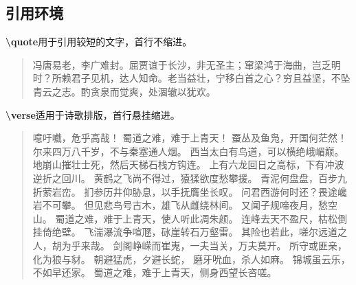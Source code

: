 \documentclass[utf8]{book}
\newcommand{\latexcommand}[1]{\textbf{\textbackslash #1}}
\begin{document}
		\subsection{引用环境}
		\latexcommand{quote}用于引用较短的文字，首行不缩进。
		\begin{quote}
			冯唐易老，李广难封。屈贾谊于长沙，非无圣主；窜梁鸿于海曲，岂乏明时？所赖君子见机，达人知命。老当益壮，宁移白首之心？穷且益坚，不坠青云之志。酌贪泉而觉爽，处涸辙以犹欢。
		\end{quote}
		\latexcommand{verse}适用于诗歌排版，首行悬挂缩进。
		\begin{verse}
			噫吁嚱，危乎高哉！
			蜀道之难，难于上青天！
			蚕丛及鱼凫，开国何茫然！
			尔来四万八千岁，不与秦塞通人烟。
			西当太白有鸟道，可以横绝峨嵋巅。
			地崩山摧壮士死，然后天梯石栈方钩连。
			上有六龙回日之高标，下有冲波逆折之回川。
			黄鹤之飞尚不得过，猿猱欲度愁攀援。
			青泥何盘盘，百步九折萦岩峦。
			扪参历井仰胁息，以手抚膺坐长叹。
			问君西游何时还？畏途巉岩不可攀。
			但见悲鸟号古木，雄飞从雌绕林间。
			又闻子规啼夜月，愁空山。
			蜀道之难，难于上青天，使人听此凋朱颜。
			连峰去天不盈尺，枯松倒挂倚绝壁。
			飞湍瀑流争喧豗，砯崖转石万壑雷。
			其险也若此，嗟尔远道之人，胡为乎来哉。
			剑阁峥嵘而崔嵬，一夫当关，万夫莫开。
			所守或匪亲，化为狼与豺。
			朝避猛虎，夕避长蛇，
			磨牙吮血，杀人如麻。
			锦城虽云乐，不如早还家。
			蜀道之难，难于上青天，侧身西望长咨嗟。
		\end{verse}
		
\end{document}
